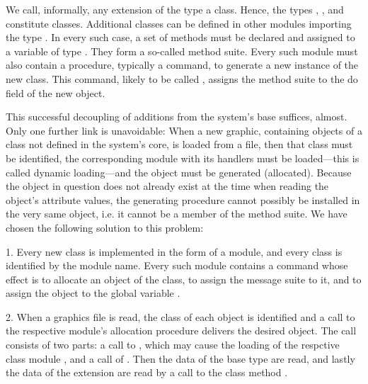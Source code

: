 We call, informally, any extension of the type  a class. Hence, the types , , and  constitute classes. Additional classes can be defined in other modules importing the type . In every such case, a set of methods must be declared and assigned to a variable of type . They form a so-called method suite. Every such module must also contain a procedure, typically a command, to generate a new instance of the new class. This command, likely to be called , assigns the method suite to the do field of the new object.

This successful decoupling of additions from the system's base suffices, almost. Only one further link is unavoidable: When a new graphic, containing objects of a class not defined in the system's core, is loaded from a file, then that class must be identified, the corresponding module with its handlers must be loaded---this is called dynamic loading---and the object must be generated (allocated). Because the object in question does not already exist at the time when reading the object's attribute values, the generating procedure cannot possibly be installed in the very same object, i.e. it cannot be a member of the method suite. We have chosen the following solution to this problem:

\item{1.} Every new class is implemented in the form of a module, and every class is identified by the module name. Every such module contains a command whose effect is to allocate an object of the class, to assign the message suite to it, and to assign the object to the global variable .
\item{2.} When a graphics file is read, the class of each object is identified and a call to the respective module's allocation procedure delivers the desired object. The call consists of two parts: a call to , which may cause the loading of the respctive class module , and a call of . Then the data of the base type  are read, and lastly the data of the extension are read by a call to the class method .

